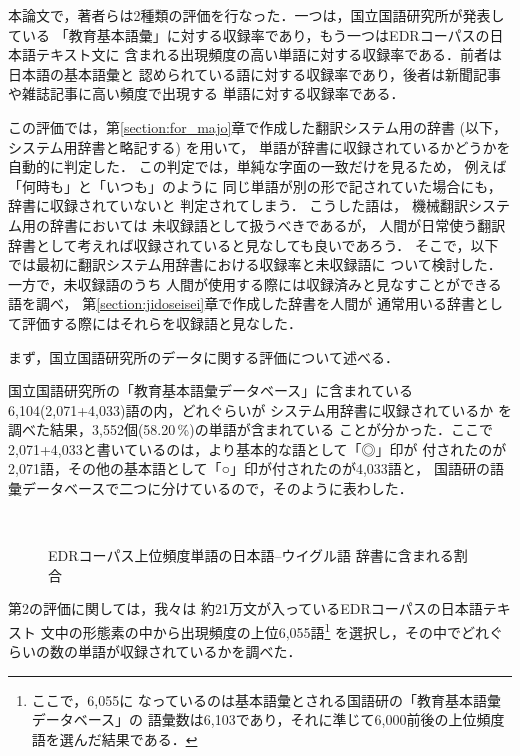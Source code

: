 {本論文で，著者らは2種類の評価を行なった．一つは，国立国語研究所が発表している
「教育基本語彙」に対する収録率であり，もう一つはEDRコーパスの日本語テキスト文に
含まれる出現頻度の高い単語に対する収録率である．前者は日本語の基本語彙と
認められている語に対する収録率であり，後者は新聞記事や雑誌記事に高い頻度で出現する
単語に対する収録率である．

この評価では，第\ref{section:for_majo}章で作成した翻訳システム用の辞書
(以下，システム用辞書と略記する)
を用いて，
単語が辞書に収録されているかどうかを自動的に判定した．
この判定では，単純な字面の一致だけを見るため，
例えば「何時も」と「いつも」のように
同じ単語が別の形で記されていた場合にも，辞書に収録されていないと
判定されてしまう．
こうした語は，
機械翻訳システム用の辞書においては
未収録語として扱うべきであるが，
人間が日常使う翻訳辞書として考えれば収録されていると見なしても良いであろう．
そこで，以下では最初に翻訳システム用辞書における収録率と未収録語に
ついて検討した．一方で，未収録語のうち
人間が使用する際には収録済みと見なすことができる語を調べ，
第\ref{section:jidoseisei}章で作成した辞書を人間が
通常用いる辞書として評価する際にはそれらを収録語と見なした．

まず，国立国語研究所のデータに関する評価について述べる．

国立国語研究所の「教育基本語彙データベース」\cite{KOKKEN}に含まれている
6,104(2,071+4,033)語の内，どれぐらいが
システム用辞書に収録されているか
を調べた結果，3,552個(58.20\,\%)の単語が含まれている
ことが分かった．ここで2,071+4,033と書いているのは，より基本的な語として「◎」印が
付されたのが2,071語，その他の基本語として「○」印が付されたのが4,033語と，
国語研の語彙データベースで二つに分けているので，そのように表わした．

\begin{figure}[tbp]
\begin{center}
 \\
\caption{EDRコーパス上位頻度単語の日本語--ウイグル語
辞書に含まれる割合}\label{myfig:cover}
\end{center}
\end{figure}

第2の評価に関しては，我々は 約21万文が入っているEDRコーパスの日本語テキスト
文中の形態素の中から出現頻度の上位6,055語\footnote{ここで，6,055に
なっているのは基本語彙とされる国語研の「教育基本語彙データベース」の
語彙数は6,103であり，それに準じて6,000前後の上位頻度語を選んだ結果である．}
を選択し，その中でどれぐらいの数の単語が収録されているかを調べた．


}
